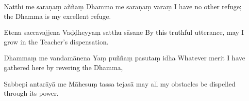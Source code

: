 \begin{chantsubsection}
  \chantlinepair
    {Natthi me saraṇaṃ aññaṃ}
    {Dhammo me saraṇaṃ varaṃ}
    {I have no other refuge; the Dhamma is my excellent refuge.}

  \chantlinepair
    {Etena saccavajjena}
    {Vaḍḍheyyaṃ satthu sāsane}
    {By this truthful utterance, may I grow in the Teacher's dispensation.}

  \chantlinepair
    {Dhammaṃ me vandamānena\footnotemark{}}
    {Yaṃ puññaṃ pasutaṃ idha}
    {Whatever merit I have gathered here by revering the Dhamma,}

  \chantlinepair
    {Sabbepi antarāyā me}
    {Māhesuṃ tassa tejasā}
    {may all my obstacles be dispelled through its power.}
\end{chantsubsection}
